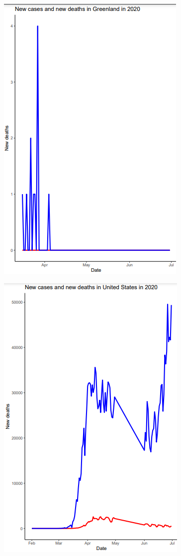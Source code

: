 \documentclass[a4paper]{article}
\theoremstyle{definition}
\begin{document}
\begin{enumerate}[i)]
\begin{enumerate}[1]
\begin{figure}[H]
			\end{figure}
			\begin{figure}[H]
				\centering
				\includegraphics[scale=0.8]{images/5.3.2.png}
			\end{figure}
			\begin{figure}[H]
				\centering
				\includegraphics[scale=0.8]{images/5.3.3.png}

\end{figure}
\end{enumerate}
\end{enumerate}
\end{document}
